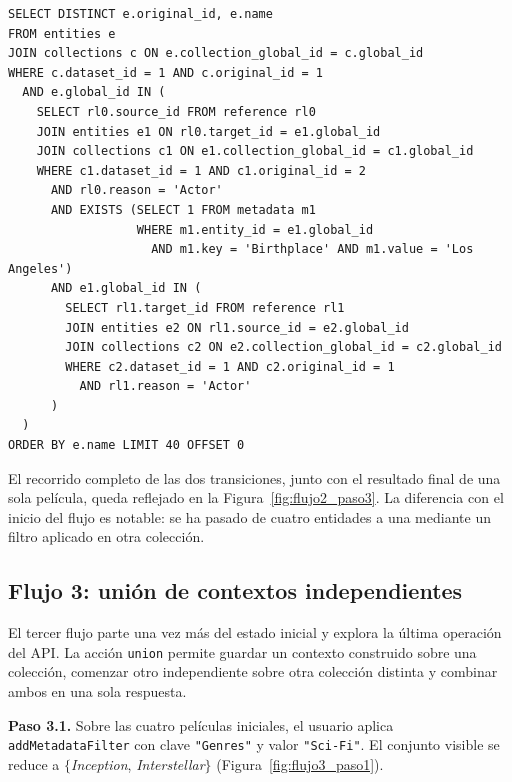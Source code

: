 \begin{lstlisting}[style=sqlStyle, label=lst:flujo2, caption={[SQL del Flujo~2]SQL acumulada al final del Flujo~2: el filtro \textit{Birthplace = Los Angeles} aplicado en \textit{People} restringe el conjunto visible de \textit{Movies}.}]
SELECT DISTINCT e.original_id, e.name
FROM entities e
JOIN collections c ON e.collection_global_id = c.global_id
WHERE c.dataset_id = 1 AND c.original_id = 1
  AND e.global_id IN (
    SELECT rl0.source_id FROM reference rl0
    JOIN entities e1 ON rl0.target_id = e1.global_id
    JOIN collections c1 ON e1.collection_global_id = c1.global_id
    WHERE c1.dataset_id = 1 AND c1.original_id = 2
      AND rl0.reason = 'Actor'
      AND EXISTS (SELECT 1 FROM metadata m1
                  WHERE m1.entity_id = e1.global_id
                    AND m1.key = 'Birthplace' AND m1.value = 'Los Angeles')
      AND e1.global_id IN (
        SELECT rl1.target_id FROM reference rl1
        JOIN entities e2 ON rl1.source_id = e2.global_id
        JOIN collections c2 ON e2.collection_global_id = c2.global_id
        WHERE c2.dataset_id = 1 AND c2.original_id = 1
          AND rl1.reason = 'Actor'
      )
  )
ORDER BY e.name LIMIT 40 OFFSET 0
\end{lstlisting}

El recorrido completo de las dos transiciones, junto con el resultado
final de una sola película, queda reflejado en la
Figura~\ref{fig:flujo2_paso3}. La diferencia con el inicio del flujo
es notable: se ha pasado de cuatro entidades a una mediante un filtro
aplicado en otra colección.

\FloatBarrier

\subsection{Flujo 3: unión de contextos independientes}
\label{subsec:flujo_union}

El tercer flujo parte una vez más del estado inicial y explora la
última operación del API. La acción \texttt{union} permite guardar un
contexto construido sobre una colección, comenzar otro independiente
sobre otra colección distinta y combinar ambos en una sola respuesta.

\textbf{Paso 3.1.} Sobre las cuatro películas iniciales, el usuario
aplica \texttt{addMetadataFilter} con clave \texttt{"Genres"} y valor
\texttt{"Sci-Fi"}. El conjunto visible se reduce a
$\{$\textit{Inception}, \textit{Interstellar}$\}$
(Figura~\ref{fig:flujo3_paso1}).

